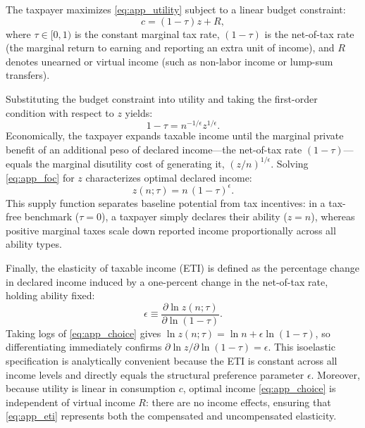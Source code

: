 The taxpayer maximizes \eqref{eq:app_utility} subject to a linear budget constraint:
\begin{equation}
c = (1-\tau)z + R,
\label{eq:app_budget}
\end{equation}
where $\tau \in [0,1)$ is the constant marginal tax rate, $(1-\tau)$ is the net-of-tax rate (the marginal return to earning and reporting an extra unit of income), and $R$ denotes unearned or virtual income (such as non-labor income or lump-sum transfers).

Substituting the budget constraint into utility and taking the first-order condition with respect to $z$ yields:
\begin{equation}
1-\tau = n^{-1/\epsilon}z^{1/\epsilon}.
\label{eq:app_foc}
\end{equation}
Economically, the taxpayer expands taxable income until the marginal private benefit of an additional peso of declared income---the net-of-tax rate $(1-\tau)$---equals the marginal disutility cost of generating it, $(z/n)^{1/\epsilon}$. Solving \eqref{eq:app_foc} for $z$ characterizes optimal declared income:
\begin{equation}
z(n;\tau) = n\,(1-\tau)^{\epsilon}.
\label{eq:app_choice}
\end{equation}
This supply function separates baseline potential from tax incentives: in a tax-free benchmark ($\tau = 0$), a taxpayer simply declares their ability ($z = n$), whereas positive marginal taxes scale down reported income proportionally across all ability types.

Finally, the elasticity of taxable income (ETI) is defined as the percentage change in declared income induced by a one-percent change in the net-of-tax rate, holding ability fixed:
\begin{equation}
\epsilon \equiv \frac{\partial \ln z(n;\tau)}{\partial \ln (1-\tau)}.
\label{eq:app_eti}
\end{equation}
Taking logs of \eqref{eq:app_choice} gives $\ln z(n;\tau) = \ln n + \epsilon \ln(1-\tau)$, so differentiating immediately confirms $\partial \ln z / \partial \ln(1-\tau) = \epsilon$. This isoelastic specification is analytically convenient because the ETI is constant across all income levels and directly equals the structural preference parameter $\epsilon$. Moreover, because utility is linear in consumption $c$, optimal income \eqref{eq:app_choice} is independent of virtual income $R$: there are no income effects, ensuring that \eqref{eq:app_eti} represents both the compensated and uncompensated elasticity.


